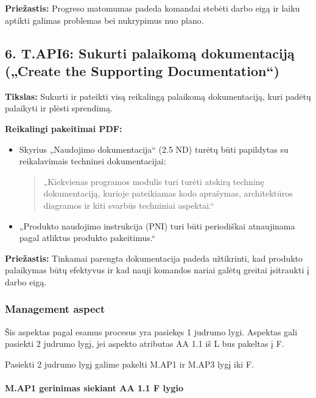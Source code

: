 \documentclass{article}
\begin{document}
\textbf{Priežastis:} Progreso matomumas padeda komandai stebėti darbo eigą ir laiku aptikti galimas problemas bei nukrypimus nuo plano.

\subsection*{6. T.API6: Sukurti palaikomą dokumentaciją („Create the Supporting Documentation“) }

\textbf{Tikslas:} Sukurti ir pateikti visą reikalingą palaikomą dokumentaciją, kuri padėtų palaikyti ir plėsti sprendimą.

\textbf{Reikalingi pakeitimai PDF:}
\begin{itemize}
    \item Skyrius „Naudojimo dokumentacija“ (2.5 ND) turėtų būti papildytas su reikalavimais techninei dokumentacijai:
    \begin{quote}
    „Kiekvienas programos modulis turi turėti atskirą techninę dokumentaciją, kurioje pateikiamas kodo aprašymas, architektūros diagramos ir kiti svarbūs techniniai aspektai.“
    \end{quote}
    \item „Produkto naudojimo instrukcija (PNI) turi būti periodiškai atnaujinama pagal atliktus produkto pakeitimus.“
\end{itemize}

\textbf{Priežastis:} Tinkamai parengta dokumentacija padeda užtikrinti, kad produkto palaikymas būtų efektyvus ir kad nauji komandos nariai galėtų greitai įsitraukti į darbo eigą.

\subsubsection{Management aspect}

Šis aspektas pagal esamus procesus yra pasiekęs 1 judrumo lygi. Aspektas gali pasiekti 2 judrumo lygį, jei
aspekto atributas AA 1.1 iš L bus pakeltas į F.

Pasiekti 2 judrumo lygį galime pakelti M.AP1 ir M.AP3 lygį iki F.

\paragraph{M.AP1 gerinimas siekiant AA 1.1 F lygio}
\end{document}
